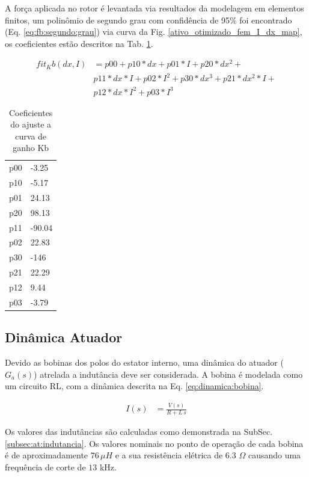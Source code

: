 A força aplicada no rotor é levantada via resultados da modelagem em elementos
finitos, um polinômio de segundo grau com confidência de 95\% foi encontrado
(Eq. \ref{eq:fb:segundo:grau}) via curva da Fig.
\ref{ativo_otimizado_fem_I_dx_map}, os coeficientes estão descritos na Tab. \ref{tab:dinamico:ajuste:kb}.

\begin{align}
     fit_Kb(dx,I) &= p00 + p10*dx + p01*I + p20*dx^2 +\\
     & p11*dx*I + p02*I^2 + p30*dx^3 + p21*dx^2*I +\\
     & p12*dx*I^2 + p03*I^3
     \label{eq:fb:segundo:grau}
\end{align}

\begin{table}[ht!]
\centering
\begin{tabular}{c l}
	   p00 & -3.25\\
	   p10 & -5.17\\
	   p01 &  24.13\\
	   p20 &   98.13\\
	   p11 & -90.04\\
	   p02 &  22.83\\
	   p30 &   -146\\
	   p21 &  22.29\\
	   p12 &  9.44	\\
	   p03 & -3.79
\end{tabular} 
\caption{Coeficientes do ajuste a curva de ganho Kb}
\label{tab:dinamico:ajuste:kb}
\end{table}

\subsection{Dinâmica Atuador}

Devido as bobinas dos polos do estator interno, uma dinâmica do atuador ($G_a(s)$) atrelada a indutância deve ser considerada. A bobina é modelada como um circuito RL, com a dinâmica descrita na Eq. \eqref{eq:dinamica:bobina}.

\begin{align}
	I(s) &= \frac{V(s)}{R + L \, s} 
	\label{eq:dinamica:bobina}
\end{align}

Os valores das indutâncias são calculadas como demonstrada na SubSec. \ref{subsec:at:indutancia}. Os valores nominais no ponto de operação de cada bobina é de aproximadamente $76 \, \mu H$ e a sua resistência elétrica de 6.3 $\Omega$ causando uma frequência de corte de $13$ kHz. 

